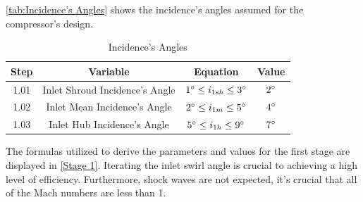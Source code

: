 \documentclass[12pt, letter]{report}
\begin{document}
\newpage

\autoref{tab:Incidence's Angles} shows the incidence's angles assumed for the compressor's design.

\begin{table}[H]
    \centering
    \caption{Incidence's Angles  \cite{lectureslides}}
    \begin{tabular}{|c|c|c|c|} \hline 
          \textbf{Step} &\textbf{Variable}&  \textbf{Equation}& \textbf{Value}\\ \hline 
         1.01&  Inlet Shroud Incidence's Angle&  $1\degree \leq i_{1sh} \leq 3\degree$& $2\degree$\\ \hline 
         1.02& Inlet Mean Incidence's Angle&  $2\degree \leq i_{1m} \leq 5\degree$& $4\degree$\\ \hline 
         1.03& Inlet Hub Incidence's Angle&  $5\degree \leq i_{1h} \leq 9\degree$& $7\degree$\\ \hline
    \end{tabular}
    
    \label{tab:Incidence's Angles}
\end{table}

The formulas utilized to derive the parameters and values for the first stage are displayed in \autoref{Stage 1}. Iterating the inlet swirl angle is crucial to achieving a high level of efficiency. Furthermore, shock waves are not expected, it's crucial that all of the Mach numbers are less than 1.
\end{document}
